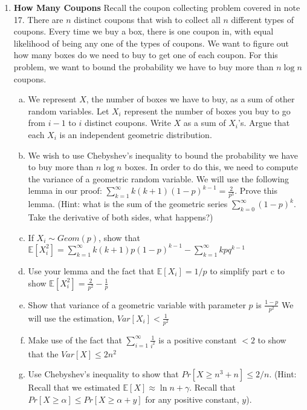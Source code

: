 \documentclass[11pt]{article}
\begin{document}
\begin{enumerate}
\item {\bf How Many Coupons}
Recall the coupon collecting problem covered in note 17. There are $n$ distinct coupons that wish to collect all $n$ different types of coupons. Every time we buy a box, there is one coupon in, with equal likelihood of being any one of the types of coupons. We want to figure out how many boxes do we need to buy to get one of each coupon. For this problem, we want to bound the probability we have to buy more than $n\log{n}$ coupons.
\begin{enumerate}[a)]
\item We represent $X$, the number of boxes we have to buy, as a sum of other random variables. Let $X_i$ represent the number of boxes you buy to go from $i-1$ to $i$ distinct coupons. Write $X$ as a sum of $X_i$'s. Argue that each $X_i$ is an independent geometric distribution.
\item We wish to use Chebyshev's inequality to bound the probability we have to buy more than $n \log{n}$ boxes. In order to do this, we need to compute the variance of a geometric random variable. We will use the following lemma in our proof: $\sum\nolimits_{k=1}^{\infty} k(k+1)(1-p)^{k-1} = \frac{2}{p^3}$. Prove this lemma. (Hint: what is the sum of the geometric series $\sum\nolimits_{k=0}^{\infty} (1-p)^k$. Take the derivative of both sides, what happens?)
\item If $X_i \sim Geom(p)$, show that $\mathbb{E}[X_i^2] = \sum\nolimits_{k=1}^{\infty} k(k+1)p(1-p)^{k-1} - \sum\nolimits_{k=1}^{\infty} kpq^{k-1}$
\item Use your lemma and the fact that $\mathbb{E}[X_i] = 1/p$ to simplify part c to show $\mathbb{E}[X_i^2] = \frac{2}{p^2} - \frac{1}{p} $
\item Show that variance of a geometric variable with parameter $p$ is $\frac{1-p}{p^2}$ We will use the estimation, $Var[X_i] < \frac{1}{p^2}$
\item Make use of the fact that $\sum\nolimits_{i=1}^{\infty} \frac{1}{i^2}$ is a positive constant $<2$ to show that the $Var[X] \leq 2n^2$ 
\item Use Chebyshev's inequality to show that $Pr[ X \geq n^3 + n] \leq 2/n $. (Hint: Recall that we estimated $\mathbb{E}[X] \approx \ln{n} + \gamma$. Recall that $Pr[X \geq \alpha] \leq Pr[X \geq \alpha + y]$ for any positive constant, $y$).


\end{enumerate}


\end{enumerate}
\end{document}
